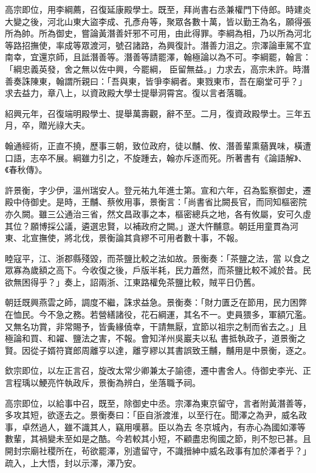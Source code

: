 \begin{pinyinscope}
 高宗即位，用李綱薦，召復延康殿學士。既至，拜尚書右丞兼權門下侍郎。時建炎大變之後，河北山東大盜李成、孔彥舟等，聚眾各數十萬，皆以勤王為名，願得張所為帥。所為御史，嘗論黃潛善奸邪不可用，由此得罪。李綱為相，乃以所為河北等路招撫使，率成等眾渡河，號召諸路，為興復計。潛善力沮之。宗澤論車駕不宜南幸，宜還京師，且詆潛善等。潛善等請罷澤，翰極論以為不可。李綱罷，翰言：「綱忠義英發，舍之無以佐中興，今罷綱，
 臣留無益。」力求去，高宗未許。時潛善奏誅陳東，翰謂所親曰：「吾與東，皆爭李綱者。東戮東市，吾在廟堂可乎？」求去益力，章八上，以資政殿大學士提舉洞霄宮。復以言者落職。



 紹興元年，召復端明殿學士、提舉萬壽觀，辭不至。二月，復資政殿學士。三年五月，卒，贈光祿大夫。



 翰通經術，正直不撓，歷事三朝，致位政府，徒以黼、攸、潛善輩熏蕕異味，橫遭口語，志卒不展。綱雖力引之，不旋踵去，翰亦斥逐而死。所著書有《論語解》、《春秋傳》。



 許景衡，字少伊，溫州瑞安人。登元祐九年進士第。宣和六年，召為監察御史，遷殿中侍御史。是時，王黼、蔡攸用事，景衡言：「尚書省比闕長官，而同知樞密院亦久闕。雖三公通治三省，然文昌政事之本，樞密總兵之地，各有攸屬，安可久虛其位？願博採公議，遴選忠賢，以補政府之闕。」遂大忤黼意。朝廷用童貫為河東、北宣撫使，將北伐，景衡論其貪繆不可用者數十事，不報。



 睦寇平，江、浙郡縣殘毀，而茶鹽比較之法如故。景衡奏：「茶鹽之法，當
 以食之眾寡為歲額之高下。今收復之後，戶版半耗，民力蕭然，而茶鹽比較不減於昔。民欲無困得乎？」奏上，詔兩浙、江東路權免茶鹽比較，賊平日仍舊。



 朝廷既興燕雲之師，調度不繼，誅求益急。景衡奏：「財力匱乏在節用，民力困弊在恤民。今不急之務。若營繕諸役，花石綱運，其名不一。吏員猥多，軍額冗濫。又無名功賞，非常賜予，皆夤緣僥幸，干請無厭，宜節以祖宗之制而省去之。」且極論和買、和糴、鹽法之害，不報。會知洋州吳巖夫以私
 書抵執政子，道景衡之賢。因從子婿符寶郎周離亨以達，離亨繆以其書誤致王黼，黼用是中景衡，逐之。



 欽宗即位，以左正言召，旋改太常少卿兼太子諭德，遷中書舍人。侍御史李光、正言程瑀以鯁亮忤執政斥，景衡為辨白，坐落職予祠。



 高宗即位，以給事中召，既至，除御史中丞。宗澤為東京留守，言者附黃潛善等，多攻其短，欲逐去之。景衡奏曰：「臣自浙渡淮，以至行在。聞澤之為尹，威名政事，卓然過人，雖不識其人，竊用嘆慕。臣以為去
 冬京城內，有赤心為國如澤等數輩，其禍變未至如是之酷。今若較其小短，不顧盡忠徇國之節，則不恕已甚。且開封宗廟社稷所在，茍欲罷澤，別遣留守，不識搢紳中威名政事有加於澤者乎？」疏入，上大悟，封以示澤，澤乃安。




\end{pinyinscope}
